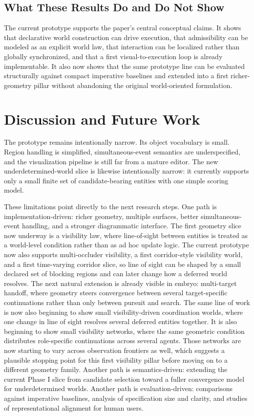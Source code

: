 \documentclass[sigplan,review,anonymous]{acmart}
\begin{document}
\subsection{What These Results Do and Do Not Show}

The current prototype supports the paper's central conceptual claims.
It shows that declarative world construction can drive execution, that admissibility can be modeled as an explicit world law, that interaction can be localized rather than globally synchronized, and that a first visual-to-execution loop is already implementable.
It also now shows that the same prototype line can be evaluated structurally against compact imperative baselines and extended into a first richer-geometry pillar without abandoning the original world-oriented formulation.

\section{Discussion and Future Work}

The prototype remains intentionally narrow.
Its object vocabulary is small.
Region handling is simplified, simultaneous-event semantics are underspecified, and the visualization pipeline is still far from a mature editor.
The new underdetermined-world slice is likewise intentionally narrow: it currently supports only a small finite set of candidate-bearing entities with one simple scoring model.

These limitations point directly to the next research steps.
One path is implementation-driven: richer geometry, multiple surfaces, better simultaneous-event handling, and a stronger diagrammatic interface.
The first geometry slice now underway is a visibility law, where line-of-sight between entities is treated as a world-level condition rather than as ad hoc update logic. The current prototype now also supports multi-occluder visibility, a first corridor-style visibility world, and a first time-varying corridor slice, so line of sight can be shaped by a small declared set of blocking regions and can later change how a deferred world resolves.
The next natural extension is already visible in embryo: multi-target handoff, where geometry steers convergence between several target-specific continuations rather than only between pursuit and search.
The same line of work is now also beginning to show small visibility-driven coordination worlds, where one change in line of sight resolves several deferred entities together.
It is also beginning to show small visibility networks, where the same geometric condition distributes role-specific continuations across several agents.
Those networks are now starting to vary across observation frontiers as well, which suggests a plausible stopping point for this first visibility pillar before moving on to a different geometry family.
Another path is semantics-driven: extending the current Phase I slice from candidate selection toward a fuller convergence model for underdetermined worlds.
Another path is evaluation-driven: comparisons against imperative baselines, analysis of specification size and clarity, and studies of representational alignment for human users.
\end{document}
